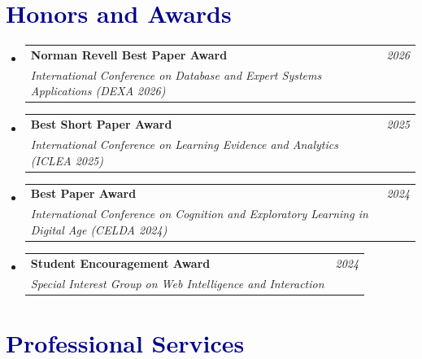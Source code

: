 \documentclass[a4paper,11pt]{article}
\makeatletter
\newcommand{\resumeProject}[4]{
\vspace{0.5mm}\item
    \begin{tabular*}{0.98\textwidth}[t]{l@{\extracolsep{\fill}}r}
        \textbf{#1} & \textit{\footnotesize{#3}} \\
        \footnotesize{\textit{#2}} & \footnotesize{#4}
    \end{tabular*}
    \vspace{-2.4mm}
}
\newcommand{\resumeSubHeadingListStart}{\begin{itemize}[leftmargin=*,labelsep=1mm]}
\newcommand{\resumeSubHeadingListEnd}{\end{itemize}\vspace{2mm}}
\makeatother
\begin{document}




\section{\textcolor{darkblue}{\textbf{Honors and Awards}}}
\vspace{-0.4mm}
\resumeSubHeadingListStart

\resumeProject
  {Norman Revell Best Paper Award}
  {International Conference on Database and Expert Systems Applications (DEXA 2026)}
  {2026}
  {}

\resumeProject
  {Best Short Paper Award}
  {International Conference on Learning Evidence and Analytics (ICLEA 2025)}
  {2025}
  {}

\resumeProject
  {Best Paper Award}
  {International Conference on Cognition and Exploratory Learning in Digital Age (CELDA 2024)}
  {2024}
  {}

\resumeProject
  {Student Encouragement Award}
  {Special Interest Group on Web Intelligence and Interaction}
  {2024}
  {}

\resumeSubHeadingListEnd
\vspace{-4mm}

\section{\textcolor{darkblue}{\textbf{Professional Services}}}
\end{document}

